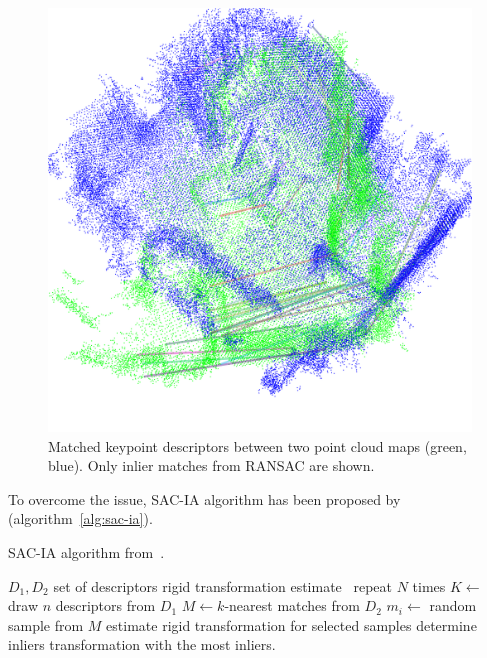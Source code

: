 \begin{figure}
    \centering
    \includegraphics[width=\textwidth]{../img/v1-matching.png}
    \caption[Keypoint matches]{Matched keypoint descriptors between two point cloud maps (green, blue). Only inlier matches from \gls{RANSAC} are shown.}
    \label{fig:v1-matching}
\end{figure}

To overcome the issue, \gls{SAC-IA} algorithm has been proposed by~\citet{rusu2009fpfh} (algorithm~\ref{alg:sac-ia}).

\begin{algorithm}
    \caption[\gls{SAC-IA}]{\gls{SAC-IA} algorithm from~\citet{rusu2009fpfh}.}
    \label{alg:sac-ia}
    \begin{algorithmic}[1]
        \Require $D_1, D_2$ set of descriptors
        \Ensure rigid transformation estimate
            \Loop~repeat $N$ times
                \State $K \gets$ draw $n$ descriptors from $D_1$
                    \State $M \gets k$-nearest matches from $D_2$
                    \State $m_i \gets$ random sample from $M$
                \EndFor
                \State estimate rigid transformation for selected samples
                \State determine inliers
            \EndLoop
            \State \Return transformation with the most inliers.
        \EndFunction
    \end{algorithmic}
\end{algorithm}

